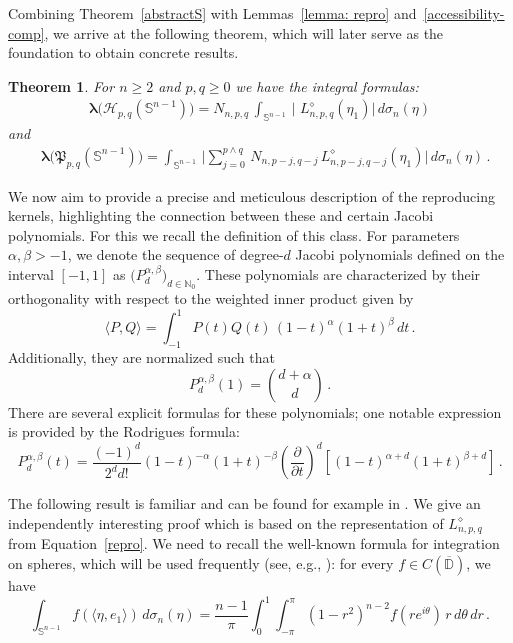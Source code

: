 \documentclass[12pt]{amsart}
\numberwithin{subsection}{section}
\newtheorem{theorem}{Theorem}[section]
\theoremstyle{definition}
\theoremstyle{remark}
\begin{document}
Combining Theorem~\ref{abstractS} with Lemmas~\ref{lemma: repro} and~\ref{accessibility-comp}, we arrive at the following theorem, which
will later serve as the foundation to obtain concrete results.


\smallskip

\begin{theorem}  \label{top}
For $n\geq 2$ and $p,q \geq 0 $ we have the integral formulas:
\begin{align*}
\boldsymbol{\lambda}\big(\mathcal{H}_{p,q}(\mathbb{S}^{n-1})\big) = N_{n,p,q}\,\int_{\mathbb{S}^{n-1}}\,
\Big|  \,\,L^{\diamond}_{n,p,q}(\eta_1)\Big| \,d\sigma_n(\eta)
\end{align*}
and
\begin{align*}
&
  \boldsymbol{\lambda}\big(\mathfrak{P}_{p,q}(\mathbb{S}^{n-1})\big)
 =
\int_{\mathbb{S}^{n-1}}\,
 \Big| \sum_{j=0}^{p \wedge q} \,N_{n,p-j,q-j}\,L^{\diamond}_{n,p-j, q-j}(\eta_1)\Big| \,d\sigma_n(\eta)\,.
\end{align*}
\end{theorem}


We now aim to provide a precise and meticulous description of the reproducing kernels, highlighting the connection between these and certain Jacobi polynomials.
For this we recall the definition of this class. For parameters  $\alpha, \beta > -1 $, we denote the sequence of degree-$d $ Jacobi polynomials defined on the interval  $[-1,1] $ as  $\big(P_d^{\alpha, \beta}\big)_{d \in \mathbb{N}_0} $. These polynomials are characterized by their  orthogonality with respect to the weighted inner product given by
\[
\langle P, Q \rangle = \int_{-1}^{1} P(t) Q(t) \, (1-t)^\alpha (1+t)^\beta \, dt\,.
\]
Additionally, they are normalized such that
\[
P_d^{\alpha, \beta}(1) = \binom{d+\alpha}{d}\,.
\]
There are several explicit formulas  for these polynomials; one notable expression is provided by the Rodrigues formula:
\begin{equation}\label{rodjac}
  P_d^{\alpha, \beta}(t) = \frac{(-1)^d}{2^d d!}
  (1-t)^{-\alpha} (1+t)^{-\beta}
  \left(\frac{\partial}{\partial t}\right)^d \left[(1-t)^{\alpha+d} (1+t)^{\beta+d}\right]\,.
\end{equation}

The following result is familiar and can be found for example in \cite[Theorem 3.3.]{Koornwinder1972}. We give an independently
interesting proof which is based on the representation of  $L^{\diamond}_{n,p,q} $ from Equation~\eqref{repro}. We need to recall
the well-known formula for integration on spheres, which will be used frequently (see, e.g., \cite[1.4.5. (2)]{rudin1980}):
for every  $f \in C(\overline{\mathbb{D}}) $, we have
\begin{equation}\label{integration}
\int_{\mathbb{S}^{n-1}} f(\langle \eta , e_1 \rangle) \, d\sigma_n(\eta) =
\frac{n-1}{\pi} \int_{0}^{1} \int_{-\pi}^{\pi} (1-r^2)^{n-2} f(r e^{i\theta}) \, r \, d\theta \,dr \,.
\end{equation}
\end{document}
